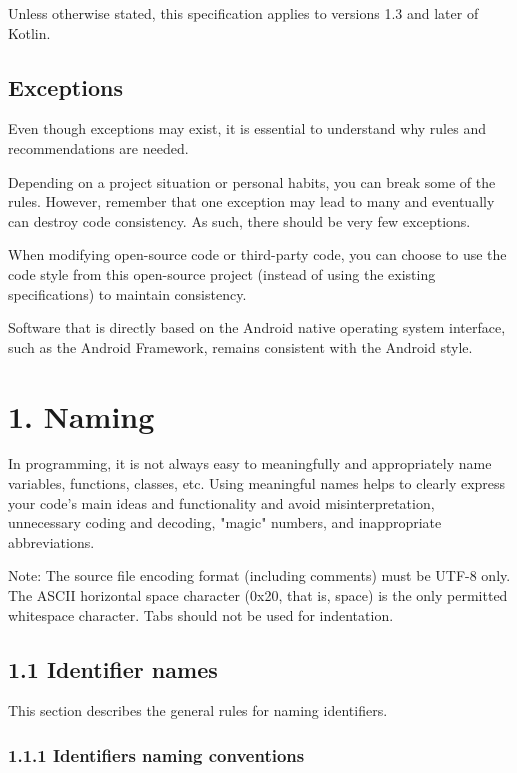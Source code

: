 Unless otherwise stated, this specification applies to versions 1.3 and later of Kotlin.



\subsection*{\textbf{Exceptions}}



Even though exceptions may exist, it is essential to understand why rules and recommendations are needed.

Depending on a project situation or personal habits, you can break some of the rules. However, remember that one exception may lead to many and eventually can destroy code consistency. As such, there should be very few exceptions.

When modifying open-source code or third-party code, you can choose to use the code style from this open-source project (instead of using the existing specifications) to maintain consistency.

Software that is directly based on the Android native operating system interface, such as the Android Framework, remains consistent with the Android style.

\section*{\textbf{1. Naming}}

In programming, it is not always easy to meaningfully and appropriately name variables, functions, classes, etc. Using meaningful names helps to clearly express your code's main ideas and functionality and avoid misinterpretation, unnecessary coding and decoding, "magic" numbers, and inappropriate abbreviations.



Note: The source file encoding format (including comments) must be UTF-8 only. The ASCII horizontal space character (0x20, that is, space) is the only permitted whitespace character. Tabs should not be used for indentation.



\subsection*{\textbf{1.1 Identifier names}}

This section describes the general rules for naming identifiers.

\subsubsection*{\textbf{1.1.1 Identifiers naming conventions}}
\leavevmode\newline



